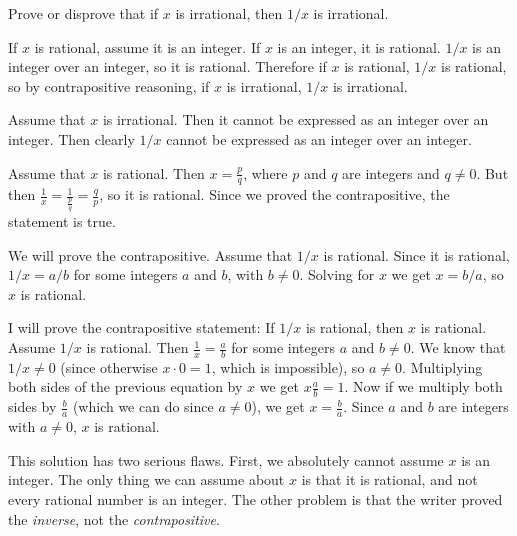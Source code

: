 \begin{eval}
Prove or disprove that if $x$ is irrational, then $1/x$ is irrational.
\begin{spfenum}
\item
If $x$ is rational, assume it is an integer.  If $x$ is an integer, it is rational.
$1/x$ is an integer over an integer, so it is rational.  Therefore if $x$ is rational,
$1/x$ is rational, so by contrapositive reasoning, if $x$ is irrational, $1/x$ is irrational.\\
\evallinethree
\item
Assume that $x$ is irrational.  Then it cannot be expressed as an integer over an integer.
Then clearly $1/x$ cannot be expressed as an integer over an integer.\\
\evallinethree
\item
Assume that $x$ is rational.  Then $x=\frac{p}{q}$, where $p$ and $q$ are integers and $q\neq 0$.
But then $\displaystyle \frac{1}{x}=\frac{1}{\frac{p}{q}}=\frac{q}{p}$, so it is rational. 
Since we proved the contrapositive, the statement 
is true.\\
\evallinethree
\item
We will prove the contrapositive.  Assume that $1/x$ is rational.  
Since it is rational, $1/x=a/b$ for some integers
$a$ and $b$, with $b\neq 0$. Solving for $x$ we get $x=b/a$, so $x$ is rational.\\
\evallinethree
\item
I will prove the contrapositive statement:  If $1/x$ is
rational, then $x$ is rational.  Assume $1/x$ is rational.
Then $\frac{1}{x}=\frac{a}{b}$ for some integers $a$ and $b\neq 0$.
We know that $1/x\neq 0$ (since otherwise $x\cdot 0 = 1$, which is impossible), so
$a\neq 0$.  
Multiplying both sides of the previous equation by $x$ we get $x\frac{a}{b}=1$. Now if we multiply
both sides by $\frac{b}{a}$ (which we can do since $a\neq 0$), we get $x=\frac{b}{a}$.
Since $a$ and $b$ are integers with $a\neq 0$, $x$ is rational.\\
\evallinethree
\end{spfenum}
\begin{answer}
\begin{pfevalenum}
\item
This solution has two serious flaws.  First, we absolutely cannot assume $x$ is an integer.
The only thing we can assume about $x$ is that it is rational, and not every rational number
is an integer.  
The other problem is that the writer proved the {\em inverse}, not the {\em contrapositive}.

\end{pfevalenum}
\end{answer}
\end{eval}
